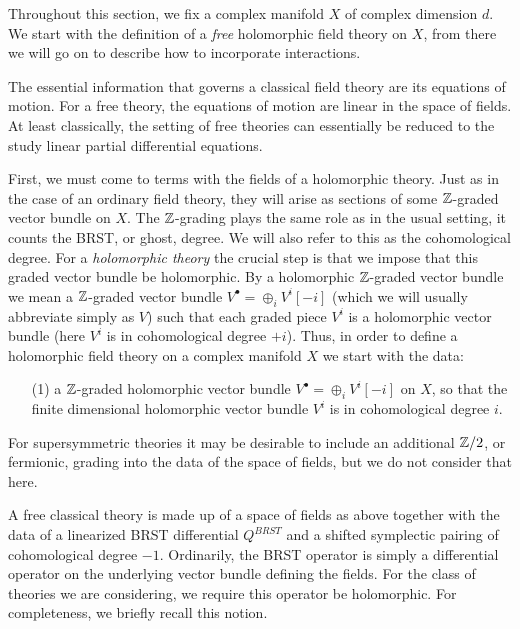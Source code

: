 \documentclass[10pt]{amsart}
\begin{document}
Throughout this section, we fix a complex manifold $X$ of complex dimension $d$. 
We start with the definition of a {\em free} holomorphic field theory on $X$, from there we will go on to describe how to incorporate interactions. 

The essential information that governs a classical field theory are its equations of motion. 
For a free theory, the equations of motion are linear in the space of fields.
At least classically, the setting of free theories can essentially be reduced to the study linear partial differential equations.

First, we must come to terms with the fields of a holomorphic theory. 
Just as in the case of an ordinary field theory, they will arise as sections of some $\mathbb Z$-graded vector bundle on $X$.
The $\mathbb Z$-grading plays the same role as in the usual setting, it counts the BRST, or ghost, degree. 
We will also refer to this as the cohomological degree.
For a {\em holomorphic theory} the crucial step is that we impose that this graded vector bundle be holomorphic.  
By a holomorphic $\mathbb Z$-graded vector bundle we mean a $\mathbb Z$-graded vector bundle $
V^\bullet = \oplus_i V^i [-i]$ (which we will usually abbreviate simply as $V$) such that each graded piece $V^i$ is a holomorphic vector bundle (here $V^i$ is in cohomological degree $+i$).
Thus, in order to define a holomorphic field theory on a complex manifold $X$ we start with the data:

\begin{itemize}
\item[(1)] a $\mathbb Z$-graded holomorphic vector bundle $V^\bullet = \oplus_i V^i [-i]$ on $X$, so that the finite dimensional holomorphic vector bundle $V^i$ is in cohomological degree $i$. 
\end{itemize}

\begin{rmk}
For supersymmetric theories it may be desirable to include an additional $\mathbb Z/2$, or fermionic, grading into the data of the space of fields, but we do not consider that here.
\end{rmk}

A free classical theory is made up of a space of fields as above together with the data of a linearized BRST differential $Q^{BRST}$ and a shifted symplectic pairing of cohomological degree $-1$. 
Ordinarily, the BRST operator is simply a differential operator on the underlying vector bundle defining the fields. 
For the class of theories we are considering, we require this operator be holomorphic. 
For completeness, we briefly recall this notion.
\end{document}
